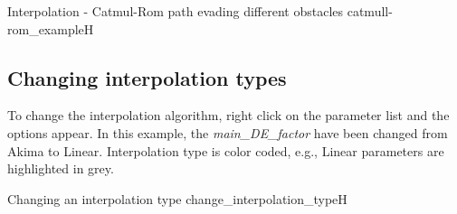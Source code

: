 {Interpolation - Catmul-Rom path evading different obstacles}
{catmull-rom_example}{H}

\subsection{Changing interpolation types}\label{changing-interpolation-types}

To change the interpolation algorithm, right click on the parameter list and the
options appear. In this example, the \emph{main\_DE\_factor} have been
changed from Akima to Linear. Interpolation type is color coded, e.g., Linear
parameters are highlighted in grey.

{Changing an interpolation type}
{change_interpolation_type}{H}
